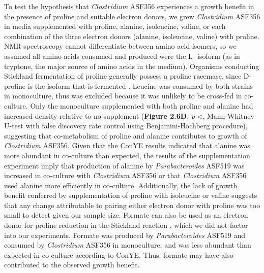\documentclass[11pt,onecolumn,notitlepage,openany,twoside]{book}
\begin{document}
\begin{refsection}
To test the hypothesis that \textit{Clostridium} ASF356 experiences a growth benefit in the presence of proline and suitable electron donors, we grew \textit{Clostridium} ASF356 in media supplemented with proline, alanine, isoleucine, valine, or each combination of the three electron donors (alanine, isoleucine, valine) with proline. NMR spectroscopy cannot differentiate between amino acid isomers, so we assumed all amino acids consumed and produced were the L- isoform (as in tryptone, the major source of amino acids in the medium). Organisms conducting Stickland fermentation of proline generally possess a proline racemase, since D-proline is the isoform that is fermented \cite{Watanabe2015-wa}. Leucine was consumed by both strains in monoculture, thus was excluded because it was unlikely to be cross-fed in co-culture. Only the monoculture supplemented with both proline and alanine had increased density relative to no supplement (\textbf{Figure 2.6D}, \textit{p} \textless{}, Mann-Whitney U-test with false discovery rate control using Benjamini-Hochberg procedure), suggesting that co-metabolism of proline and alanine contributes to growth of \textit{Clostridium} ASF356. Given that the ConYE results indicated that alanine was more abundant in co-culture than expected, the results of the supplementation experiment imply that production of alanine by \textit{Parabacteroides} ASF519 was increased in co-culture with \textit{Clostridium} ASF356 or that \textit{Clostridium} ASF356 used alanine more efficiently in co-culture. Additionally, the lack of growth benefit conferred by supplementation of proline with isoleucine or valine suggests that any change attributable to pairing either electron donor with proline was too small to detect given our sample size. Formate can also be used as an electron donor for proline reduction in the Stickland reaction \cite{Kabisch1999-jf}, which we did not factor into our experiments. Formate was produced by \textit{Parabacteroides} ASF519 and consumed by \textit{Clostridium} ASF356 in monoculture, and was less abundant than expected in co-culture according to ConYE. Thus, formate may have also contributed to the observed growth benefit.


\end{refsection}
\end{document}
